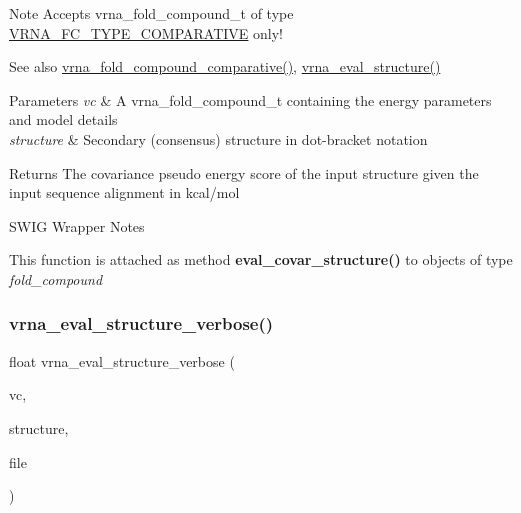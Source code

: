 \begin{DoxyNote}{Note}
Accepts vrna\+\_\+fold\+\_\+compound\+\_\+t of type \hyperlink{group__fold__compound_gga01a4ff86fa71deaaa5d1abbd95a1447dab821ce46ea3cf665be97df22a76f5023}{V\+R\+N\+A\+\_\+\+F\+C\+\_\+\+T\+Y\+P\+E\+\_\+\+C\+O\+M\+P\+A\+R\+A\+T\+I\+VE} only!
\end{DoxyNote}
\begin{DoxySeeAlso}{See also}
\hyperlink{group__fold__compound_gad6bacc816af274922b13d947f708aa0c}{vrna\+\_\+fold\+\_\+compound\+\_\+comparative()}, \hyperlink{group__eval_ga58f199f1438d794a265f3b27fc8ea631}{vrna\+\_\+eval\+\_\+structure()}
\end{DoxySeeAlso}

\begin{DoxyParams}{Parameters}
{\em vc} & A vrna\+\_\+fold\+\_\+compound\+\_\+t containing the energy parameters and model details \\
\hline
{\em structure} & Secondary (consensus) structure in dot-\/bracket notation \\
\hline
\end{DoxyParams}
\begin{DoxyReturn}{Returns}
The covariance pseudo energy score of the input structure given the input sequence alignment in kcal/mol
\end{DoxyReturn}
\begin{DoxyRefDesc}{S\+W\+I\+G Wrapper Notes}
\item[\hyperlink{wrappers__wrappers000029}{S\+W\+I\+G Wrapper Notes}]This function is attached as method {\bfseries eval\+\_\+covar\+\_\+structure()} to objects of type {\itshape fold\+\_\+compound} \end{DoxyRefDesc}
\mbox{\label{group__eval_ga0928d699d310178f84ee2351034e5cb5}} 
\subsubsection{\texorpdfstring{vrna\+\_\+eval\+\_\+structure\+\_\+verbose()}{vrna\_eval\_structure\_verbose()}}
{\footnotesize\ttfamily float vrna\+\_\+eval\+\_\+structure\+\_\+verbose (\begin{DoxyParamCaption}\item[{\hyperlink{group__fold__compound_ga1b0cef17fd40466cef5968eaeeff6166}{vrna\+\_\+fold\+\_\+compound\+\_\+t} $\ast$}]{vc,  }\item[{const char $\ast$}]{structure,  }\item[{F\+I\+LE $\ast$}]{file }\end{DoxyParamCaption})}




